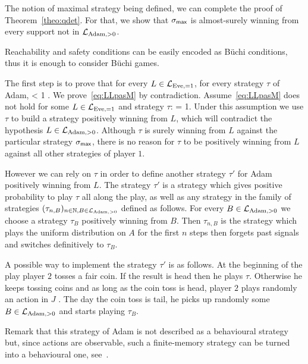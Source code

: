 The notion of maximal strategy being defined,
we can complete the proof of Theorem~\ref{theo:qdet}.
For that, we show that
$\sigma_{\textsf{max}}$
is almost-surely
winning from every support not in $\mathcal{L}_{\text{Adam},>0}$.



Reachability and safety conditions can be easily encoded as B\"uchi conditions,
thus it is enough to consider  B\"uchi games.



The first step is to prove that for every $L\in\mathcal{L}_{\text{Eve},=1}$,
for every strategy $\tau$ of Adam,
\be\label{eq:LLpasM}
 < 1 \enspace.
\ee
We prove~\eqref{eq:LLpasM} by contradiction.
Assume~\eqref{eq:LLpasM} does not hold for some $L\in \mathcal{L}_{\text{Eve},=1}$
and strategy $\tau$:
\be\label{eq:winsafe}
 = 1\enspace.
\ee
Under this assumption we use $\tau$ to build a strategy positively winning from $L$,
which will contradict the hypothesis 
$L\in\mathcal{L}_{\text{Adam},>0}$.
Although $\tau$ is surely winning from $L$ against the particular strategy $\sigma_{\textsf{max}}$,
there is no reason for $\tau$ to be positively winning from $L$
against all other strategies of player $1$.
{
However we can rely on $\tau$
in order to define another strategy 
$\tau'$ for Adam positively winning from $L$.
The strategy $\tau'$ is a strategy
which gives positive probability to play $\tau$
all along the play,
as well as any strategy in the family
of strategies
$(\tau_{n,B})_{n\in\mathbb{N},B\in \mathcal{L}_{\text{Adam},>0}}$ defined as follows.
For every $B\in\mathcal{L}_{\text{Adam},>0}$ we choose a strategy $\tau_B$ positively winning from $B$.
Then
$\tau_{n,B}$ is the strategy which plays 
the uniform distribution on $A$ for the first $n$ steps then forgets past signals and switches definitively to $\tau_B$. 

A possible way to implement the  strategy $\tau'$
is as follows.
At the beginning of the play
player $2$ tosses a fair coin. If the result is head then he plays $\tau$. Otherwise he keeps 
tossing coins and as long as the coin toss is head, player $2$ plays randomly an action in $J$ .
The day the coin toss is tail, he picks up randomly some $B\in\mathcal{L}_{\text{Adam},>0}$ and starts playing $\tau_B$.
}
Remark that this strategy of Adam is not described as a behavioural strategy
but, since actions are observable,
such a finite-memory strategy can be turned into a behavioural one,
see~\cite[Lemma 4.6 and 4.7]{BGGjacm}.



